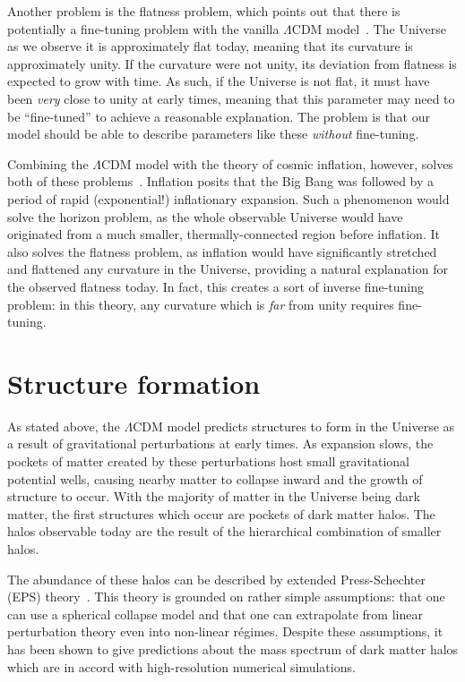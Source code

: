 Another problem is the flatness problem, which points out that there is
potentially a fine-tuning problem with the vanilla \(\Lambda\)CDM
model~\cite{bergstrom_cosmology_2008,schneider_extragalactic_2015}. The
Universe as we observe it is approximately flat today, meaning that its
curvature is approximately unity. If the curvature were not unity, its
deviation from flatness is expected to grow with time. As such, if the
Universe is not flat, it must have been \emph{very} close to unity at early
times, meaning that this parameter may need to be ``fine-tuned'' to achieve a
reasonable explanation. The problem is that our model should be able to
describe parameters like these \emph{without} fine-tuning.

Combining the \(\Lambda\)CDM model with the theory of cosmic inflation,
however, solves both of these problems~\cite{bergstrom_cosmology_2008}.
Inflation posits that the Big Bang was followed by a period of rapid
(exponential!) inflationary expansion. Such a phenomenon would solve the
horizon problem, as the whole observable Universe would have originated from a
much smaller, thermally-connected region before inflation. It also solves the
flatness problem, as inflation would have significantly stretched and
flattened any curvature in the Universe, providing a natural explanation for
the observed flatness today. In fact, this creates a sort of inverse
fine-tuning problem: in this theory, any curvature which is \emph{far} from
unity requires fine-tuning.

\hypertarget{structure-formation}{%
\section{Structure formation}\label{structure-formation}}

As stated above, the \(\Lambda\)CDM model predicts structures to form in
the Universe as a result of gravitational perturbations at early times.
As expansion slows, the pockets of matter created by these perturbations
host small gravitational potential wells, causing nearby matter to
collapse inward and the growth of structure to occur. With the majority
of matter in the Universe being dark matter, the first structures which
occur are pockets of dark matter halos. The halos observable today are
the result of the hierarchical combination of smaller halos.

The abundance of these halos can be described by extended
Press-Schechter (EPS) theory~\cite{bullock_small-scale_2017}. This
theory is grounded on rather simple assumptions: that one can use a
spherical collapse model and that one can extrapolate from linear
perturbation theory even into non-linear régimes. Despite these
assumptions, it has been shown to give predictions about the mass
spectrum of dark matter halos which are in accord with high-resolution
numerical simulations.

